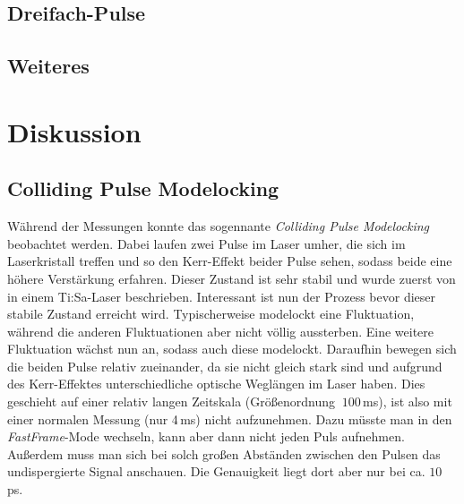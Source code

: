 \documentclass[bachelor,       %
               twoside,        %
               BCOR10mm,       %
               english,ngerman, %
               ]{GAUBM}
\begin{document}
%   

\section{Dreifach-Pulse}

\section{Weiteres}

\chapter{Diskussion}
\section{Colliding Pulse Modelocking}
Während der Messungen konnte das sogennante \textit{Colliding Pulse Modelocking} beobachtet werden.
Dabei laufen zwei Pulse im Laser umher, die sich im Laserkristall treffen und so den Kerr-Effekt beider Pulse sehen, sodass beide eine höhere Verstärkung erfahren.
Dieser Zustand ist sehr stabil und wurde zuerst von \cite{lai_multiple_1997} in einem Ti:Sa-Laser beschrieben.
Interessant ist nun der Prozess bevor dieser stabile Zustand erreicht wird.
Typischerweise modelockt eine Fluktuation, während die anderen Fluktuationen aber nicht völlig aussterben.
Eine weitere Fluktuation wächst nun an, sodass auch diese modelockt.
Daraufhin bewegen sich die beiden Pulse relativ zueinander, da sie nicht gleich stark sind und aufgrund des Kerr-Effektes unterschiedliche optische Weglängen im Laser haben.
Dies geschieht auf einer relativ langen Zeitskala (Größenordnung $~100\,$ms), ist also mit einer normalen Messung (nur 4\,ms) nicht aufzunehmen.
Dazu müsste man in den \textit{FastFrame}-Mode wechseln, kann aber dann nicht jeden Puls aufnehmen.
Außerdem muss man sich bei solch großen Abständen zwischen den Pulsen das undispergierte Signal anschauen.
Die Genauigkeit liegt dort aber nur bei ca. $10\,$ps.
\end{document}
